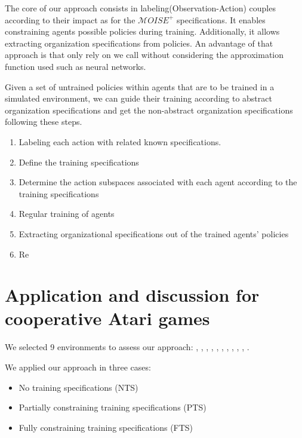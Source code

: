 \documentclass[runningheads]{llncs}
\begin{document}
The core of our approach consists in labeling(Observation-Action) couples according to their impact as for the $\mathcal{M}OISE^+$ specifications. It enables constraining agents possible policies during training. Additionally, it allows extracting organization specifications from policies. An advantage of that approach is that only rely on  we call  without considering the approximation function used such as neural networks.

Given a set of untrained policies within agents that are to be trained in a simulated environment, we can guide their training according to abstract organization specifications and get the non-abstract organization specifications following these steps.

\begin{enumerate}
    \item Labeling each action with related known specifications.
    \item Define the training specifications
    \item Determine the action subspaces associated with each agent according to the training specifications
    \item Regular training of agents
    \item Extracting organizational specifications out of the trained agents' policies
    \item Re
\end{enumerate}

\section{Application and discussion for cooperative Atari games}

We selected 9 environments to assess our approach: , , , , , , , , , , .

We applied our approach in three cases:
\begin{itemize}
    \item No training specifications (NTS)
    \item Partially constraining training specifications (PTS)
    \item Fully constraining training specifications (FTS)
\end{itemize}
\end{document}
